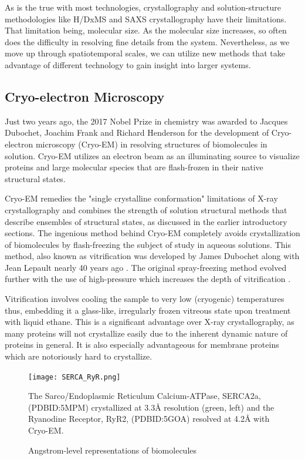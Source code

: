 \documentclass[12pt]{ucsddissertation}
\begin{document}
\begin{dissertationintroduction}
 As is the true with most technologies, crystallography and solution-structure methodologies like H/DxMS and SAXS crystallography have their limitations. That limitation being, molecular size. As the molecular size increases, so often does the difficulty in resolving fine details from the system. Nevertheless, as we move up through spatiotemporal scales, we can utilize new methods that take advantage of different technology to gain insight into larger systems. 
 
\subsection{Cryo-electron Microscopy}

Just two years ago, the 2017 Nobel Prize in chemistry was awarded to Jacques Dubochet, Joachim Frank and Richard Henderson for the development of Cryo-electron microscopy (Cryo-EM) in resolving structures of biomolecules in solution. Cryo-EM utilizes an electron beam as an illuminating source to visualize proteins and large molecular species that are flash-frozen in their native structural states. 

Cryo-EM remedies the "single crystalline conformation" limitations of X-ray crystallography and combines the strength of solution structural methods that describe ensembles of structural states, as discussed in the earlier introductory sections. The ingenious method behind Cryo-EM completely avoids crystallization of biomolecules by flash-freezing the subject of study in aqueous solutions. This method, also known as vitrification was developed by James Dubochet along with Jean Lepault nearly 40 years ago \cite{Dubochet1982,Lepault1983,Lepault1986}. The original spray-freezing method evolved further with the use of high-pressure which increases the depth of vitrification \cite{SARTORI1993}. 

Vitrification involves cooling the sample to very low (cryogenic) temperatures thus, embedding it a glass-like, irregularly frozen vitreous state upon treatment with liquid ethane. This is a significant advantage over X-ray crystallography, as many proteins will not crystallize easily due to the inherent dynamic nature of proteins in general. It is also especially advantageous for membrane proteins which are notoriously hard to crystallize.

\setcounter{figure}{3}
\begin{figure}
\centerline{\texttt{[image: SERCA\_RyR.png]}}
	\caption{Angstrom-level representations of biomolecules} The Sarco/Endoplasmic Reticulum Calcium-ATPase, SERCA2a, (PDBID:5MPM) crystallized at 3.3\si{\angstrom} resolution (green, left) and the Ryanodine Receptor, RyR2, (PDBID:5GOA) resolved at 4.2\si{\angstrom} with Cryo-EM. 
\end{figure}


\end{dissertationintroduction}
\end{document}
